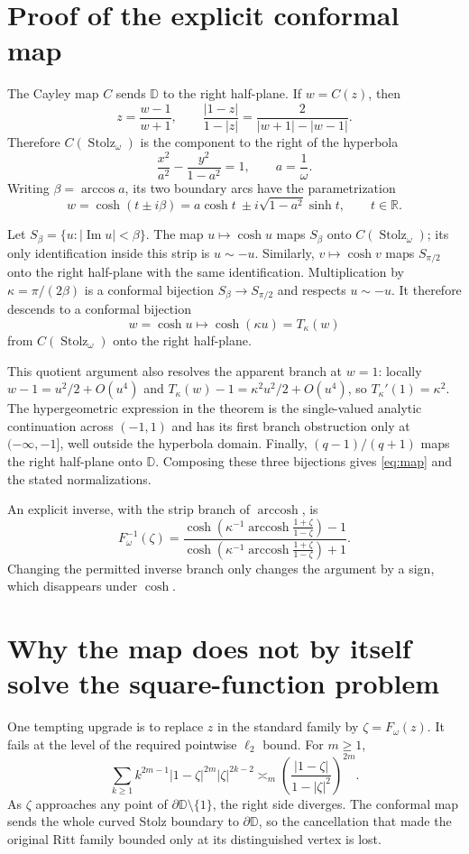 \documentclass[11pt]{article}
\newcommand{\D}{\mathbb D}
\newcommand{\St}{\operatorname{Stolz}}
\begin{document}
\section{Proof of the explicit conformal map}

The Cayley map $C$ sends $\D$ to the right half-plane.  If $w=C(z)$, then
\[
 z=\frac{w-1}{w+1},\qquad
 \frac{|1-z|}{1-|z|}=\frac{2}{|w+1|-|w-1|}.
\]
Therefore $C(\St_\omega)$ is the component to the right of the hyperbola
\[
 \frac{x^2}{a^2}-\frac{y^2}{1-a^2}=1,\qquad a=\frac1\omega.
\]
Writing $\beta=\arccos a$, its two boundary arcs have the parametrization
\[
 w=\cosh(t\pm i\beta)
   =a\cosh t\ \pm i\sqrt{1-a^2}\sinh t,\qquad t\in\mathbb R.
\]

Let $S_\beta=\{u:|\operatorname{Im}u|<\beta\}$.  The map
$u\mapsto\cosh u$ maps $S_\beta$ onto $C(\St_\omega)$; its only
identification inside this strip is $u\sim-u$.  Similarly,
$v\mapsto\cosh v$ maps $S_{\pi/2}$ onto the right half-plane with the same
identification.  Multiplication by
$\kappa=\pi/(2\beta)$ is a conformal bijection
$S_\beta\to S_{\pi/2}$ and respects $u\sim-u$.  It therefore descends to a
conformal bijection
\[
 w=\cosh u\longmapsto \cosh(\kappa u)=T_\kappa(w)
\]
from $C(\St_\omega)$ onto the right half-plane.

This quotient argument also resolves the apparent branch at $w=1$: locally
$w-1=u^2/2+O(u^4)$ and
$T_\kappa(w)-1=\kappa^2u^2/2+O(u^4)$, so
$T_\kappa'(1)=\kappa^2$.  The hypergeometric expression in the theorem is
the single-valued analytic continuation across $(-1,1)$ and has its first
branch obstruction only at $(-\infty,-1]$, well outside the hyperbola
domain.  Finally, $(q-1)/(q+1)$ maps the right half-plane onto $\D$.
Composing these three bijections gives \eqref{eq:map} and the stated
normalizations.

An explicit inverse, with the strip branch of $\operatorname{arccosh}$, is
\[
 F_\omega^{-1}(\zeta)=
 \frac{\cosh\!\left(\kappa^{-1}
       \operatorname{arccosh}\frac{1+\zeta}{1-\zeta}\right)-1}
      {\cosh\!\left(\kappa^{-1}
       \operatorname{arccosh}\frac{1+\zeta}{1-\zeta}\right)+1}.
\]
Changing the permitted inverse branch only changes the argument by a sign,
which disappears under $\cosh$.

\section{Why the map does not by itself solve the square-function problem}

One tempting upgrade is to replace $z$ in the standard family by
$\zeta=F_\omega(z)$.  It fails at the level of the required pointwise
$\ell_2$ bound.  For $m\geq1$,
\[
 \sum_{k\geq1}k^{2m-1}|1-\zeta|^{2m}|\zeta|^{2k-2}
 \asymp_m
 \left(\frac{|1-\zeta|}{1-|\zeta|^2}\right)^{2m}.
\]
As $\zeta$ approaches any point of $\partial\D\setminus\{1\}$, the right
side diverges.  The conformal map sends the whole curved Stolz boundary to
$\partial\D$, so the cancellation that made the original Ritt family
bounded only at its distinguished vertex is lost.
\end{document}
